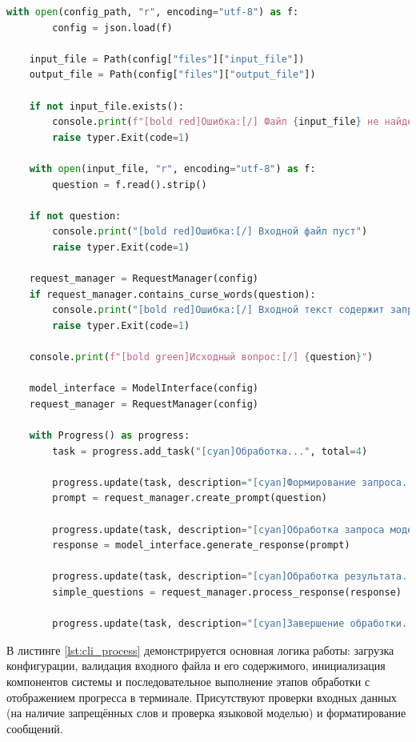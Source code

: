 \begin{lstlisting}[caption={Обработка вопроса и взаимодействие с компонентами системы}, label=lst:cli_process, language=Python]
with open(config_path, "r", encoding="utf-8") as f:
		config = json.load(f)

	input_file = Path(config["files"]["input_file"])
	output_file = Path(config["files"]["output_file"])

	if not input_file.exists():
		console.print(f"[bold red]Ошибка:[/] Файл {input_file} не найден")
		raise typer.Exit(code=1)

	with open(input_file, "r", encoding="utf-8") as f:
		question = f.read().strip()

	if not question:
		console.print("[bold red]Ошибка:[/] Входной файл пуст")
		raise typer.Exit(code=1)
	
	request_manager = RequestManager(config)
	if request_manager.contains_curse_words(question):
		console.print("[bold red]Ошибка:[/] Входной текст содержит запрещенные слова")
		raise typer.Exit(code=1)

	console.print(f"[bold green]Исходный вопрос:[/] {question}")

	model_interface = ModelInterface(config)
	request_manager = RequestManager(config)

	with Progress() as progress:
		task = progress.add_task("[cyan]Обработка...", total=4)

		progress.update(task, description="[cyan]Формирование запроса...", advance=1)
		prompt = request_manager.create_prompt(question)

		progress.update(task, description="[cyan]Обработка запроса моделью...", advance=1)
		response = model_interface.generate_response(prompt)
		
		progress.update(task, description="[cyan]Обработка результата...", advance=1)
		simple_questions = request_manager.process_response(response)
		
		progress.update(task, description="[cyan]Завершение обработки...", advance=1)
\end{lstlisting}

В листинге \ref{lst:cli_process} демонстрируется основная логика работы: загрузка конфигурации, валидация входного файла и его содержимого, инициализация компонентов системы и последовательное выполнение этапов обработки с отображением прогресса в терминале. Присутствуют проверки входных данных (на наличие запрещённых слов и проверка языковой моделью) и форматирование сообщений.

